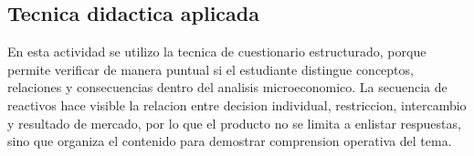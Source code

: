 \documentclass[
	spanish,
	letterpaper, oneside
]{article}
\begin{document}
\subsection{Tecnica didactica aplicada}

En esta actividad se utilizo la tecnica de cuestionario estructurado, porque permite verificar de manera puntual si el estudiante distingue conceptos, relaciones y consecuencias dentro del analisis microeconomico. La secuencia de reactivos hace visible la relacion entre decision individual, restriccion, intercambio y resultado de mercado, por lo que el producto no se limita a enlistar respuestas, sino que organiza el contenido para demostrar comprension operativa del tema.

%
\end{document}

